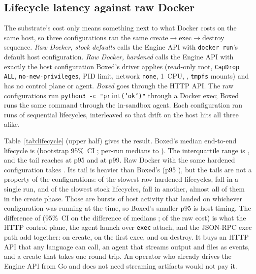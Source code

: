 \documentclass[conference]{IEEEtran}
\begin{document}
\subsection{Lifecycle latency against raw Docker}\label{sec:lifecycle}
The substrate's cost only means something next to what Docker costs on the
same host, so three configurations ran the same
create$\rightarrow$exec$\rightarrow$destroy sequence. \emph{Raw Docker,
stock defaults} calls the Engine API with \texttt{docker run}'s default host
configuration. \emph{Raw Docker, hardened} calls the Engine API with exactly
the host configuration Boxed's driver applies (read-only root,
\texttt{CapDrop ALL}, \texttt{no-new-privileges}, PID limit, network
\texttt{none}, 1~CPU, \BoxedMemDefault, \texttt{tmpfs} mounts) and has no
control plane or agent. \emph{Boxed} goes through the HTTP API. The raw
configurations run \texttt{python3 -c "print('ok')"} through a Docker exec;
Boxed runs the same command through the in-sandbox agent. Each configuration
ran \BoxedColdRuns{} runs of \BoxedColdN{} sequential lifecycles,
interleaved so that drift on the host hits all three alike.



Table~\ref{tab:lifecycle} (upper half) gives the result.
Boxed's median end-to-end lifecycle is \BoxedColdMedian{} (bootstrap
95\%~CI \BoxedColdMedianCI; per-run medians \BoxedColdRunMedianMin{} to
\BoxedColdRunMedianMax). The interquartile range is \BoxedColdIQR{}, and the
tail reaches \BoxedColdPNinetyFive{} at p95 and \BoxedColdPNinetyNine{} at
p99. Raw Docker with the same hardened configuration takes
\BaseHardMedian{}. Its tail is heavier than Boxed's (p95
\BaseHardPNinetyFive{}), but the tails are not a property of the
configurations: of the \BaseHardTailN{} slowest raw-hardened lifecycles,
\BaseHardTailClusterMax{} fall in a single run, and of the
\BaseDefTailN{} slowest stock lifecycles, \BaseDefTailClusterMax{} fall in
another, almost all of them in the create phase. Those are bursts of host
activity that landed on whichever configuration was running at the time, so
Boxed's smaller p95 is host timing. The difference of \BoxedOverheadMedian{} (95\%~CI on the
difference of medians \BoxedOverheadCI; \BoxedOverheadPct{} of the raw cost)
is what the HTTP control plane, the agent launch over \texttt{exec} attach,
and the JSON-RPC exec path add together: \BoxedOverheadCreate{} on create,
\BoxedOverheadExec{} on the first exec, and \BoxedOverheadDestroy{} on
destroy. It buys an HTTP API that any language can call, an agent that
streams output and files as events, and a create that takes one round trip.
An operator who already drives the Engine API from Go and does not need
streaming artifacts would not pay it.
\end{document}
